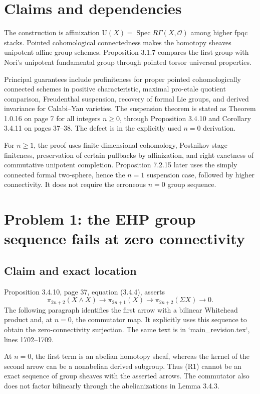 \documentclass[10pt]{article}
\begin{document}
\section*{Claims and dependencies}
The construction is affinization \(\mathrm U(X)=\operatorname{Spec}R\Gamma(X,\mathcal O)\) among higher fpqc stacks. Pointed cohomological connectedness makes the homotopy sheaves unipotent affine group schemes. Proposition 3.1.7 compares the first group with Nori’s unipotent fundamental group through pointed torsor universal properties.\par
Principal guarantees include profiniteness for proper pointed cohomologically connected schemes in positive characteristic, maximal pro-etale quotient comparison, Freudenthal suspension, recovery of formal Lie groups, and derived invariance for Calabi–Yau varieties. The suspension theorem is stated as Theorem 1.0.16 on page 7 for all integers \(n\ge0\), through Proposition 3.4.10 and Corollary 3.4.11 on pages 37–38. The defect is in the explicitly used \(n=0\) derivation.\par
For \(n\ge1\), the proof uses finite-dimensional cohomology, Postnikov-stage finiteness, preservation of certain pullbacks by affinization, and right exactness of commutative unipotent completion. Proposition 7.2.15 later uses the simply connected formal two-sphere, hence the \(n=1\) suspension case, followed by higher connectivity. It does not require the erroneous \(n=0\) group sequence.\par
\section*{Problem 1: the EHP group sequence fails at zero connectivity}
\subsection*{Claim and exact location}
Proposition 3.4.10, page 37, equation (3.4.4), asserts \[\pi_{2n+2}(X\wedge X)\longrightarrow
 \pi_{2n+1}(X)\longrightarrow
 \pi_{2n+2}(\Sigma X)\longrightarrow0.
 \tag{R1}\] The following paragraph identifies the first arrow with a bilinear Whitehead product and, at \(n=0\), the commutator map. It explicitly uses this sequence to obtain the zero-connectivity surjection. The same text is in `main\_revision.tex`, lines 1702–1709.\par
At \(n=0\), the first term is an abelian homotopy sheaf, whereas the kernel of the second arrow can be a nonabelian derived subgroup. Thus (R1) cannot be an exact sequence of group sheaves with the asserted arrows. The commutator also does not factor bilinearly through the abelianizations in Lemma 3.4.3.\par
\end{document}
